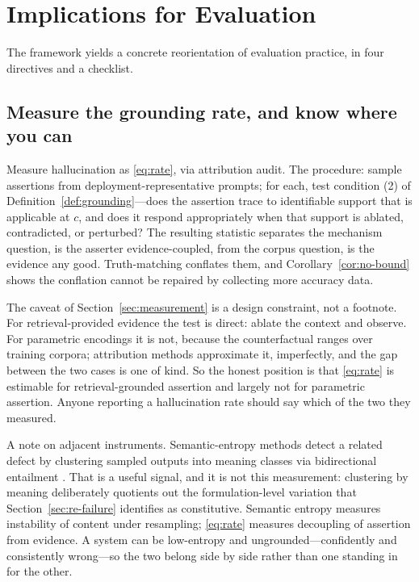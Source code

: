\section{Implications for Evaluation}
\label{sec:evaluation}

The framework yields a concrete reorientation of evaluation practice, in four
directives and a checklist.

\subsection{Measure the grounding rate, and know where you can}
\label{sec:measure-rate}

Measure hallucination as \eqref{eq:rate}, via attribution audit. The procedure:
sample assertions from deployment-representative prompts; for each, test
condition (2) of Definition~\ref{def:grounding}---does the assertion trace to
identifiable support that is applicable at $c$, and does it respond appropriately
when that support is ablated, contradicted, or perturbed? The resulting statistic
separates the mechanism question, is the asserter evidence-coupled, from the
corpus question, is the evidence any good. Truth-matching conflates them, and
Corollary~\ref{cor:no-bound} shows the conflation cannot be repaired by
collecting more accuracy data.

The caveat of Section~\ref{sec:measurement} is a design constraint, not a
footnote. For retrieval-provided evidence the test is direct: ablate the context
and observe. For parametric encodings it is not, because the counterfactual ranges
over training corpora; attribution methods approximate it, imperfectly, and the
gap between the two cases is one of kind. So the honest position is that
\eqref{eq:rate} is estimable for retrieval-grounded assertion and largely not for
parametric assertion. Anyone reporting a hallucination rate should say which of
the two they measured.

A note on adjacent instruments. Semantic-entropy methods detect a related defect
by clustering sampled outputs into meaning classes via bidirectional entailment
\citep{farquhar2024}. That is a useful signal, and it is not this measurement:
clustering by meaning deliberately quotients out the formulation-level variation
that Section~\ref{sec:re-failure} identifies as constitutive. Semantic entropy
measures instability of content under resampling; \eqref{eq:rate} measures
decoupling of assertion from evidence. A system can be low-entropy and
ungrounded---confidently and consistently wrong---so the two belong side by side
rather than one standing in for the other.

